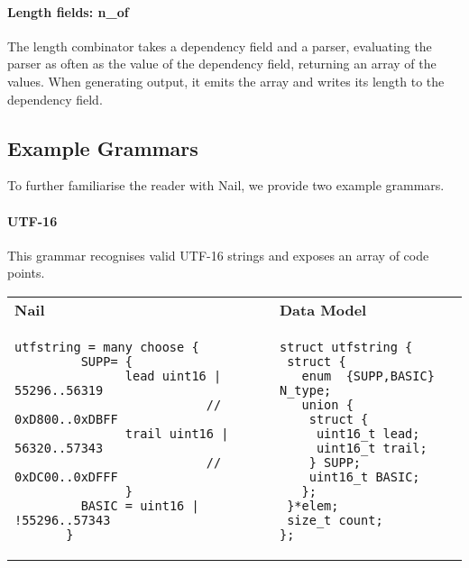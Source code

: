 \paragraph{Length fields: n_of}
The length combinator takes a dependency field and a parser, evaluating the parser as often as the
value of the dependency field, returning an array of the values. When generating output, it emits
the array and writes its length to the dependency field. 

\subsection{Example Grammars}
To further familiarise the reader with Nail, we provide two example grammars. 
\paragraph{UTF-16}
This grammar recognises valid UTF-16 strings and exposes an array of code points. 

\begin{tabular}{ll}
\textbf{Nail} & \textbf{Data Model}\\
\begin{minipage}{3in}
\begin{verbatim}
utfstring = many choose {
         SUPP= {
               lead uint16 | 55296..56319
                          // 0xD800..0xDBFF
               trail uint16 | 56320..57343
                          // 0xDC00..0xDFFF
               }
         BASIC = uint16 | !55296..57343
       }
\end{verbatim}
\end{minipage}
 & 
\begin{minipage}{2in}
\begin{verbatim}
struct utfstring {
 struct {
   enum  {SUPP,BASIC} N_type;
   union {
    struct {
     uint16_t lead;
     uint16_t trail;
    } SUPP;
    uint16_t BASIC;
   };
 }*elem;
 size_t count;
};
\end{verbatim} 
\end{minipage} 
\\
\end{tabular}

